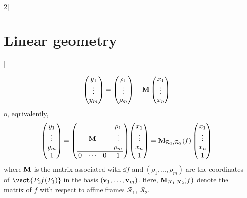 \documentclass[../../../main.tex]{subfiles}
\begin{document}
\begin{multicols}{2}[\section{Linear geometry}]
\begin{prop}
        $$
            \begin{pmatrix}
                y_1    \\
                \vdots \\
                y_m    \\
            \end{pmatrix}
            =
            \begin{pmatrix}
                \rho_1 \\
                \vdots \\
                \rho_m \\
            \end{pmatrix}
            +\boldsymbol{\mathrm{M}}
            \begin{pmatrix}
                x_1    \\
                \vdots \\
                x_n    \\
            \end{pmatrix}$$
        o, equivalently,
        $$
            \begin{pmatrix}
                y_1    \\
                \vdots \\
                y_m    \\
                1      \\
            \end{pmatrix}
            =\left(
            \begin{array}{@{\,}ccc|c@{\,}}
                      &        &   & \rho_1 \\
                      & \vf{M} &   & \vdots \\
                      &        &   & \rho_m \\
                    \hline
                    0 & \cdots & 0 & 1
                \end{array}\right)\!
            \begin{pmatrix}
                x_1    \\
                \vdots \\
                x_n    \\
                1      \\
            \end{pmatrix}
            =\vf{M}_{\mathcal{R}_1,\mathcal{R}_2}(f)
            \begin{pmatrix}
                x_1    \\
                \vdots \\
                x_n    \\
                1      \\
            \end{pmatrix}$$
        where $\boldsymbol{\mathrm{M}}$ is the matrix associated with $\dd f$ and $(\rho_1,\ldots,\rho_m)$ are the coordinates of $\vect{P_2f(P_1)}$ in the basis $(\boldsymbol{\mathrm{v}}_1,\ldots,\boldsymbol{\mathrm{v}}_m)$. Here, $\boldsymbol{\mathrm{M}}_{\mathcal{R}_1,\mathcal{R}_2}(f)$ denote the matrix of $f$ with respect to affine frames $\mathcal{R}_1$, $\mathcal{R}_2$.
    \end{prop}

\end{multicols}
\end{document}
